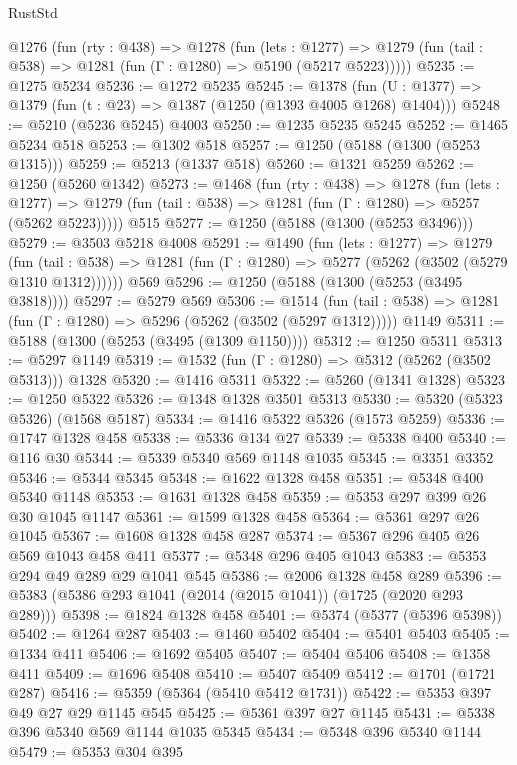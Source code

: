 \begin{lexlean}{RustStd}
\begin{coremodule}
{\begin{coremodule}
{{{{{{{{{{{{{  @1276
    (fun (rty : @438) =>
    @1278
      (fun (lets : @1277) =>
      @1279 (fun (tail : @538) => @1281 (fun (Γ : @1280) => @5190 (@5217 @5223)))))
@5235 := @1275 @5234
@5236 := @1272 @5235
@5245 := @1378 (fun (U : @1377) => @1379 (fun (t : @23) => @1387 (@1250 (@1393 @4005 @1268) @1404)))
@5248 := @5210 (@5236 @5245) @4003
@5250 := @1235 @5235 @5245
@5252 := @1465 @5234 @518
@5253 := @1302 @518
@5257 := @1250 (@5188 (@1300 (@5253 @1315)))
@5259 := @5213 (@1337 @518)
@5260 := @1321 @5259
@5262 := @1250 (@5260 @1342)
@5273 := @1468
    (fun (rty : @438) =>
    @1278
      (fun (lets : @1277) =>
      @1279 (fun (tail : @538) => @1281 (fun (Γ : @1280) => @5257 (@5262 @5223)))))
    @515
@5277 := @1250 (@5188 (@1300 (@5253 @3496)))
@5279 := @3503 @5218 @4008
@5291 := @1490
    (fun (lets : @1277) =>
    @1279
      (fun (tail : @538) => @1281 (fun (Γ : @1280) => @5277 (@5262 (@3502 (@5279 @1310 @1312))))))
    @569
@5296 := @1250 (@5188 (@1300 (@5253 (@3495 @3818))))
@5297 := @5279 @569
@5306 := @1514
    (fun (tail : @538) => @1281 (fun (Γ : @1280) => @5296 (@5262 (@3502 (@5297 @1312)))))
    @1149
@5311 := @5188 (@1300 (@5253 (@3495 (@1309 @1150))))
@5312 := @1250 @5311
@5313 := @5297 @1149
@5319 := @1532 (fun (Γ : @1280) => @5312 (@5262 (@3502 @5313))) @1328
@5320 := @1416 @5311
@5322 := @5260 (@1341 @1328)
@5323 := @1250 @5322
@5326 := @1348 @1328 @3501 @5313
@5330 := @5320 (@5323 @5326) (@1568 @5187)
@5334 := @1416 @5322 @5326 (@1573 @5259)
@5336 := @1747 @1328 @458
@5338 := @5336 @134 @27
@5339 := @5338 @400
@5340 := @116 @30
@5344 := @5339 @5340 @569 @1148 @1035
@5345 := @3351 @3352
@5346 := @5344 @5345
@5348 := @1622 @1328 @458
@5351 := @5348 @400 @5340 @1148
@5353 := @1631 @1328 @458
@5359 := @5353 @297 @399 @26 @30 @1045 @1147
@5361 := @1599 @1328 @458
@5364 := @5361 @297 @26 @1045
@5367 := @1608 @1328 @458 @287
@5374 := @5367 @296 @405 @26 @569 @1043 @458 @411
@5377 := @5348 @296 @405 @1043
@5383 := @5353 @294 @49 @289 @29 @1041 @545
@5386 := @2006 @1328 @458 @289
@5396 := @5383 (@5386 @293 @1041 (@2014 (@2015 @1041)) (@1725 (@2020 @293 @289)))
@5398 := @1824 @1328 @458
@5401 := @5374 (@5377 (@5396 @5398))
@5402 := @1264 @287
@5403 := @1460 @5402
@5404 := @5401 @5403
@5405 := @1334 @411
@5406 := @1692 @5405
@5407 := @5404 @5406
@5408 := @1358 @411
@5409 := @1696 @5408
@5410 := @5407 @5409
@5412 := @1701 (@1721 @287)
@5416 := @5359 (@5364 (@5410 @5412 @1731))
@5422 := @5353 @397 @49 @27 @29 @1145 @545
@5425 := @5361 @397 @27 @1145
@5431 := @5338 @396 @5340 @569 @1144 @1035 @5345
@5434 := @5348 @396 @5340 @1144
@5479 := @5353
    @304
    @395
}}}}}}}}}}}}}
\end{coremodule}}
\end{coremodule}
\end{lexlean}
